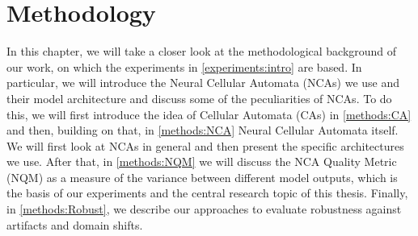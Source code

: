 \chapter{Methodology}
\label{methods:intro}
In this chapter, we will take a closer look at the methodological background of our work, on which the experiments in \autoref{experiments:intro} are based. In particular, we will introduce the Neural Cellular Automata (NCAs) we use and their model architecture and discuss some of the peculiarities of NCAs. To do this, we will first introduce the idea of Cellular Automata (CAs) in \autoref{methods:CA} and then, building on that, in \autoref{methods:NCA} Neural Cellular Automata itself. We will first look at NCAs in general and then present the specific architectures we use. After that, in \autoref{methods:NQM} we will discuss the NCA Quality Metric (NQM) as a measure of the variance between different model outputs, which is the basis of our experiments and the central research topic of this thesis. Finally, in \autoref{methods:Robust}, we describe our approaches to evaluate robustness against artifacts and domain shifts.





